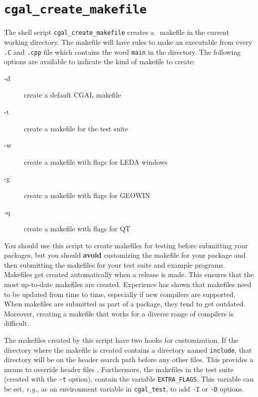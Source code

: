 \section{{\tt cgal\_create\_makefile}}
\label{sec:cgal_create_makefile}

The shell script
{{\tt cgal\_create\_makefile}} creates a \cgal\ makefile
in the current working directory.
The makefile will have rules to make an executable from every {\tt .C}
and {\tt .cpp} file which contains the word {\tt main} in the directory.
The following options are available to indicate the kind of makefile
to create:
\begin{description}
\item[-d]   create a default CGAL makefile
\item[-t]   create a makefile for the test suite
\item[-w]   create a makefile with flags for LEDA windows
\item[-g]   create a makefile with flags for GEOWIN
\item[-q]   create a makefile with flags for QT
\end{description}

You should use this script to create makefiles for testing before submitting
your packages, but you should {\bf avoid} customizing the makefile for your
package and then submitting the makefiles for your test suite and example
programs.
Makefiles get created automatically when a release is made. This ensures
that the most up-to-date makefiles are created. Experience has shown
that makefiles need to be updated from time to time, especially if new
compilers are supported. When makefiles are submitted as part of a package,
they tend to get outdated.
Moreover, creating a makefile that works for a diverse range of compilers
is difficult.

The makefiles created by this script have two hooks for customization.
If the directory
where the makefile is created contains a directory named {\tt include},%
that
directory will be on the header search path before any other files. This
provides a means to override header files%
.
Furthermore, the makefiles in the
test suite (created with the {\tt -t} option), contain the variable
{\tt EXTRA\_FLAGS}.%
This variable can be set, {\em e.g.}, as an environment variable in
{\tt cgal\_test}, to add {\tt -I} or {\tt -D} options.


